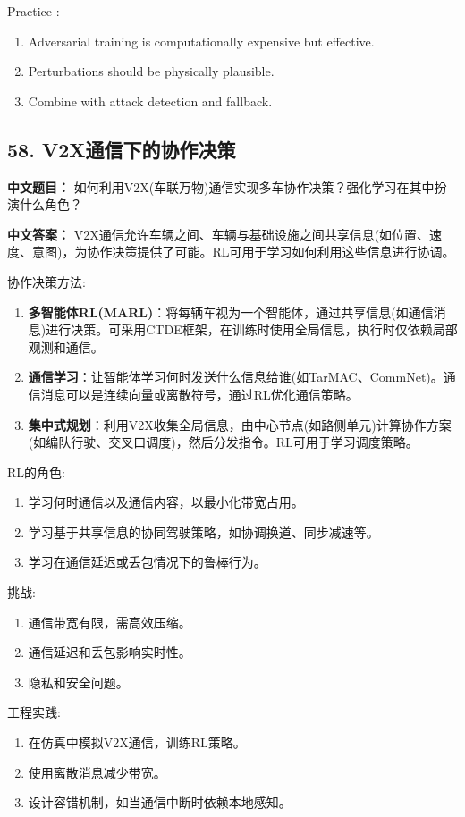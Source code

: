 \documentclass[10pt,a4paper]{ctexart}
\begin{document}
 Practice :
\begin{enumerate}
    \item Adversarial training is computationally expensive but effective.
    \item Perturbations should be physically plausible.
    \item Combine with attack detection and fallback.
\end{enumerate}

\subsection*{58. V2X通信下的协作决策}
\textbf{中文题目：} 如何利用V2X(车联万物)通信实现多车协作决策？强化学习在其中扮演什么角色？

\textbf{中文答案：}  
V2X通信允许车辆之间、车辆与基础设施之间共享信息(如位置、速度、意图)，为协作决策提供了可能。RL可用于学习如何利用这些信息进行协调。

 协作决策方法:
\begin{enumerate}
    \item \textbf{多智能体RL(MARL)}：将每辆车视为一个智能体，通过共享信息(如通信消息)进行决策。可采用CTDE框架，在训练时使用全局信息，执行时仅依赖局部观测和通信。
    \item \textbf{通信学习}：让智能体学习何时发送什么信息给谁(如TarMAC、CommNet)。通信消息可以是连续向量或离散符号，通过RL优化通信策略。
    \item \textbf{集中式规划}：利用V2X收集全局信息，由中心节点(如路侧单元)计算协作方案(如编队行驶、交叉口调度)，然后分发指令。RL可用于学习调度策略。
\end{enumerate}

 RL的角色:
\begin{enumerate}
    \item 学习何时通信以及通信内容，以最小化带宽占用。
    \item 学习基于共享信息的协同驾驶策略，如协调换道、同步减速等。
    \item 学习在通信延迟或丢包情况下的鲁棒行为。
\end{enumerate}

 挑战:
\begin{enumerate}
    \item 通信带宽有限，需高效压缩。
    \item 通信延迟和丢包影响实时性。
    \item 隐私和安全问题。
\end{enumerate}

 工程实践:
\begin{enumerate}
    \item 在仿真中模拟V2X通信，训练RL策略。
    \item 使用离散消息减少带宽。
    \item 设计容错机制，如当通信中断时依赖本地感知。
\end{enumerate}
\end{document}

